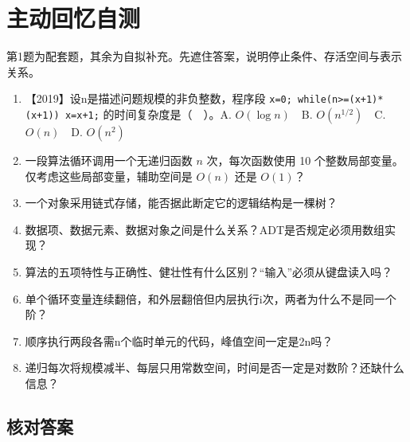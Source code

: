 \section{主动回忆自测}\label{DS01-check}

第1题为配套题，其余为自拟补充。先遮住答案，说明停止条件、存活空间与表示关系。

\begin{recallcard}

\begin{enumerate}
\def\labelenumi{\arabic{enumi}.}
\tightlist
\item
  【2019】设n是描述问题规模的非负整数，程序段 \texttt{x=\allowbreak{}0;\allowbreak{} while(\allowbreak{}n>\allowbreak{}=\allowbreak{}(\allowbreak{}x+\allowbreak{}1)\allowbreak{}*\allowbreak{}(\allowbreak{}x+\allowbreak{}1)\allowbreak{})\allowbreak{} x=\allowbreak{}x+\allowbreak{}1;\allowbreak{}} 的时间复杂度是（　）。A. \(O(\log n)\)　B. \(O(n^{1/2})\)　C. \(O(n)\)　D. \(O(n^2)\)
\item
  一段算法循环调用一个无递归函数 \(n\) 次，每次函数使用 10 个整数局部变量。仅考虑这些局部变量，辅助空间是 \(O(n)\) 还是 \(O(1)\)？
\item
  一个对象采用链式存储，能否据此断定它的逻辑结构是一棵树？
\item
  数据项、数据元素、数据对象之间是什么关系？ADT是否规定必须用数组实现？
\item
  算法的五项特性与正确性、健壮性有什么区别？``输入''必须从键盘读入吗？
\item
  单个循环变量连续翻倍，和外层翻倍但内层执行i次，两者为什么不是同一个阶？
\item
  顺序执行两段各需n个临时单元的代码，峰值空间一定是2n吗？
\item
  递归每次将规模减半、每层只用常数空间，时间是否一定是对数阶？还缺什么信息？
\end{enumerate}

\end{recallcard}

\subsection{核对答案}\label{DS01-recall-extra}

